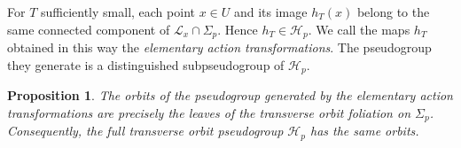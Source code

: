 \documentclass[11pt]{amsart}
\newtheorem{proposition}[theorem]{Proposition}
\theoremstyle{definition}
\theoremstyle{remark}
\newcommand{\leaf}[1]{\mathcal{L}_{#1}}
\begin{document}
For $T$ sufficiently small, each point $x\in U$ and its image $h_T(x)$ belong to the same connected component of $\leaf{x}\cap\Sigma_p$.
Hence $h_T\in\mathcal H_p$.
We call the maps $h_T$ obtained in this way the \emph{elementary action transformations}. The pseudogroup they generate is a distinguished subpseudogroup of $\mathcal H_p$.

%

\begin{proposition}
The orbits of the pseudogroup generated by the elementary action
transformations are precisely the leaves of the transverse orbit
foliation on $\Sigma_p$. Consequently, the full transverse orbit
pseudogroup $\mathcal H_p$ has the same orbits.
\end{proposition}
\end{document}
